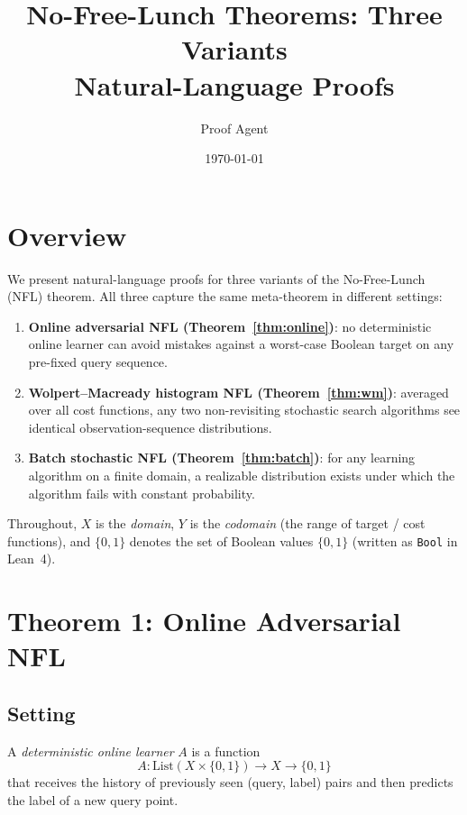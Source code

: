 \documentclass[11pt]{article}
\title{\textbf{No-Free-Lunch Theorems: Three Variants}\\[0.5em]
\large Natural-Language Proofs}
\author{Proof Agent}
\date{\today}
\theoremstyle{remark}
\newcommand{\Bool}{\{0,1\}}
\begin{document}
\maketitle
\tableofcontents
\newpage

\section{Overview}

We present natural-language proofs for three variants of the
No-Free-Lunch (NFL) theorem.  All three capture the same meta-theorem
in different settings:

\begin{enumerate}
  \item \textbf{Online adversarial NFL (Theorem~\ref{thm:online})}: no
        deterministic online learner can avoid mistakes against a
        worst-case Boolean target on any pre-fixed query sequence.

  \item \textbf{Wolpert--Macready histogram NFL
        (Theorem~\ref{thm:wm})}: averaged over all cost functions, any
        two non-revisiting stochastic search algorithms see identical
        observation-sequence distributions.

  \item \textbf{Batch stochastic NFL
        (Theorem~\ref{thm:batch})}: for any learning algorithm on a
        finite domain, a realizable distribution exists under which the
        algorithm fails with constant probability.
\end{enumerate}

Throughout, $X$ is the \emph{domain}, $Y$ is the \emph{codomain} (the
range of target / cost functions), and $\Bool$ denotes the set of
Boolean values $\{0,1\}$ (written as \texttt{Bool} in Lean~4).

\section{Theorem 1: Online Adversarial NFL}
\label{sec:online}

\subsection{Setting}

A \emph{deterministic online learner} $A$ is a function
\[
  A : \mathrm{List}(X \times \Bool) \to X \to \Bool
\]
that receives the history of previously seen (query, label) pairs and
then predicts the label of a new query point.
\end{document}
